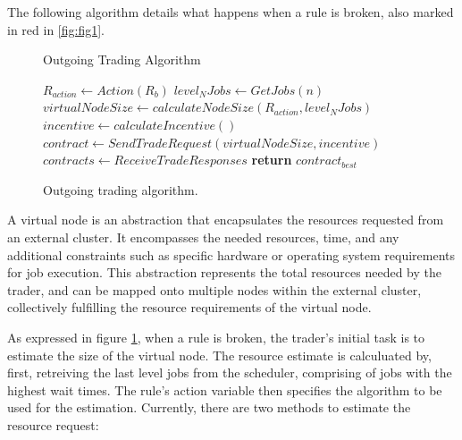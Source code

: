 The following algorithm details what happens when a rule is broken, also marked
in red in \ref{fig:fig1}.

\begin{figure}[H]
\begin{algorithm}[H]
\caption{Outgoing Trading Algorithm}
\begin{algorithmic}
   
    \State $R_{action} \gets Action(R_b)$
    \State $level_N Jobs \gets GetJobs(n)$ 
    \State $virtualNodeSize \gets calculateNodeSize(R_{action}, level_N Jobs)$
      \State $incentive \gets calculateIncentive()$
    \EndIf
      \State $contract \gets SendTradeRequest(virtualNodeSize, incentive)$
    \EndFor
    \State $contracts \gets ReceiveTradeResponses$ 
    \State \textbf{return} $contract_{best}$
  \EndProcedure
\end{algorithmic}
\end{algorithm}
\caption{Outgoing trading algorithm.}
\label{outgoing}
\end{figure}

A virtual node is an abstraction that encapsulates the resources requested from
an external cluster. It encompasses the needed resources, time, and any
additional constraints such as specific hardware or operating system
requirements for job execution. This abstraction represents the total resources
needed by the trader, and can be mapped onto multiple nodes within the external
cluster, collectively fulfilling the resource requirements of the virtual node.


As expressed in figure \ref{outgoing}, when a rule is broken, the trader's initial task is to estimate the size of the
virtual node. The resource estimate is calculuated by, first, retreiving the
last level jobs from the scheduler, comprising of jobs with the highest wait
times. The rule's action variable then specifies the algorithm to be used for
the estimation. Currently, there are two methods to estimate the resource
request:

